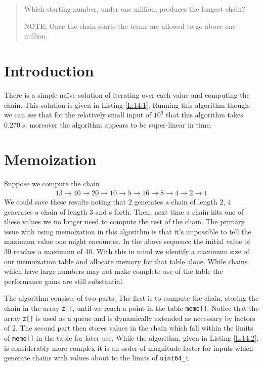 \documentclass[oneside,12pt]{book}   	%
\newcounter{ex}
\newcounter{pr}
\theoremstyle{definition}
\begin{document}
\begin{spacing}{1.618}
\begin{quote}
			Which starting number, under one million, produces the longest chain?

			NOTE: Once the chain starts the terms are allowed to go above one million.
		\end{quote}
		
	\section{Introduction}
	
		There is a simple na\"ive solution of iterating over each value and computing the chain. This solution is given in Listing \ref{L:14:1}. Running this algorithm though we can see that for the relatively small input of $10^6$ that this algorithm takes $0.270~s$; moreover the algorithm appears to be super-linear in time.  

		
	
	\section{Memoization}
		Suppose we compute the chain 
		\begin{alignat*}{4}
			13 \to 40 \to 20 \to 10 \to 5 \to 16 \to 8 \to 4 \to 2 \to 1
		\end{alignat*}
		We could save these results noting that $2$ generates  a chain of length 2, $4$ generates a chain of length $3$ and s forth. Then, next time a chain hits one of these values we no longer need to compute the rest of the chain. The primary issue with using memoization in this algorithm is that it's impossible to tell the maximum value one might encounter. In the above sequence the initial value of $30$ reaches a maximum of $40$. With this in mind we identify a maximum size of our memoization table and allocate memory for that table alone. While chains which have large numbers may not make complete use of the table the performance gains are still substantial. 
		
		The algorithm consists of two parts. The first is to compute the chain, storing the chain in the array \texttt{z[]}, until we reach a point in the table \texttt{memo[]}. Notice that the array \texttt{z[]} is used as a queue and is dynamically extended as necessary by factors of $2$. The second part then stores values in the chain which fall within the limits of \texttt{memo[]} in the table for later use. While the algorithm, given in Listing \ref{L:14:2}, is considerably more complex it is an order of magnitude faster for inputs which generate chains with values about to the limits of \texttt{uint64\_t}. 
		\clearpage
		\begin{spacing}{1}
			
		\end{spacing}		
		\clearpage
	

\end{spacing}
\end{document}

